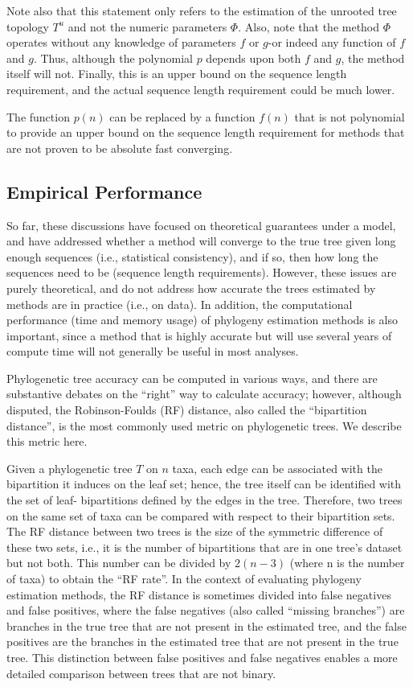 Note also that this statement only refers to the estimation of the unrooted 
tree topology $T^u$ and not the numeric parameters $\Phi$. Also, note that 
the method $\Phi$ operates without any knowledge of parameters $f$ or $g$-or 
indeed any function of $f$ and $g$. Thus, although the polynomial $p$ 
depends upon both $f$ and $g$, the method itself will not. Finally, this 
is an upper bound on the sequence length requirement, and the actual 
sequence length requirement could be much lower. 

The function $p(n)$ can be replaced by a function $f(n)$ that is not 
polynomial to provide an upper bound on the sequence length requirement 
for methods that are not proven to be absolute fast converging. 

\subsection{Empirical Performance}
So far, these discussions have focused on theoretical guarantees under a model, 
and have addressed whether a method will converge to the true tree given 
long enough sequences (i.e., statistical consistency), and if so, then 
how long the sequences need to be (sequence length requirements). However, 
these issues are purely theoretical, and do not address how accurate the 
trees estimated by methods are in practice (i.e., on data). In addition, 
the computational performance (time and memory usage) of phylogeny estimation 
methods is also important, since a method that is highly accurate but will 
use several years of compute time will not generally be useful in most analyses. 

Phylogenetic tree accuracy can be computed in various ways, and there are 
substantive debates on the ``right'' way to calculate accuracy; however, 
although disputed, the Robinson-Foulds (RF) distance, also called the 
``bipartition distance'', is the most commonly used metric on phylogenetic trees. 
We describe this metric here. 

Given a phylogenetic tree $T$ on $n$ taxa, each edge can be associated 
with the bipartition it induces on the leaf set; hence, the tree 
itself can be identified with the set of leaf- bipartitions defined 
by the edges in the tree. Therefore, two trees on the same set 
of taxa can be compared with respect to their bipartition sets. 
The RF distance between two trees is the size of the symmetric difference 
of these two sets, i.e., it is the number of bipartitions that are in one 
tree's dataset but not both. This number can be divided by $2(n - 3)$ 
(where n is the number of taxa) to obtain the ``RF rate''. In the context 
of evaluating phylogeny estimation methods, the RF distance is sometimes 
divided into false negatives and false positives, where the false 
negatives (also called ``missing branches'') are branches in the 
true tree that are not present in the estimated tree, and the 
false positives are the branches in the estimated tree that are not 
present in the true tree. This distinction between false positives 
and false negatives enables a more detailed comparison between trees 
that are not binary.

